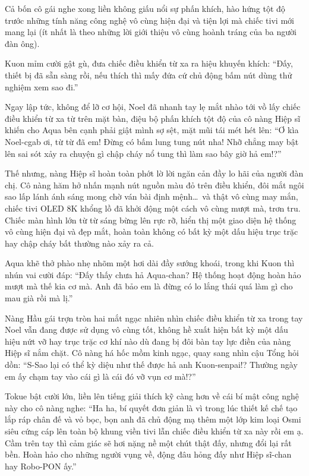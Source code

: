 \documentclass[../main.tex]{subfiles}
\begin{document}
Cả bốn cô gái nghe xong liền không giấu nổi sự phấn khích, hào hứng tột độ trước những tính năng công nghệ vô cùng hiện đại và tiện lợi mà chiếc tivi mới mang lại (ít nhất là theo những lời giới thiệu vô cùng hoành tráng của ba người đàn ông).

Kuon mỉm cười gật gù, đưa chiếc điều khiển từ xa ra hiệu khuyến khích: ``Đấy, thiết bị đã sẵn sàng rồi, nếu thích thì mấy đứa cứ chủ động bấm nút dùng thử nghiệm xem sao đi.''

Ngay lập tức, không để lỡ cơ hội, Noel đã nhanh tay lẹ mắt nhào tới vồ lấy chiếc điều khiển từ xa từ trên mặt bàn, điệu bộ phấn khích tột độ của cô nàng Hiệp sĩ khiến cho Aqua bên cạnh phải giật mình sợ sệt, mặt mũi tái mét hét lên: ``Ơ kìa Noel-cgab ơi, từ từ đã em! Đừng có bấm lung tung nút nha! Nhỡ chẳng may bật lên sai sót xảy ra chuyện gì chập cháy nổ tung thì làm sao bây giờ hả em!?''

Thế nhưng, nàng Hiệp sĩ hoàn toàn phớt lờ lời ngăn cản đầy lo hãi của người đàn chị. Cô nàng hăm hở nhấn mạnh nút nguồn màu đỏ trên điều khiển, đôi mắt ngôi sao lấp lánh ánh sáng mong chờ ván bài định mệnh\dots\ và thật vô cùng may mắn, chiếc tivi OLED 8K khổng lồ đã khởi động một cách vô cùng mượt mà, trơn tru. Chiếc màn hình lớn từ từ sáng bừng lên rực rỡ, hiển thị một giao diện hệ thống vô cùng hiện đại và đẹp mắt, hoàn toàn không có bất kỳ một dấu hiệu trục trặc hay chập cháy bất thường nào xảy ra cả.

Aqua khẽ thở phào nhẹ nhõm một hơi dài đầy sướng khoái, trong khi Kuon thì nhún vai cười đáp: ``Đấy thấy chưa hả Aqua-chan? Hệ thống hoạt động hoàn hảo mượt mà thế kia cơ mà. Anh đã bảo em là đừng có lo lắng thái quá làm gì cho mau già rồi mà lị.''

Nàng Hầu gái trợn tròn hai mắt ngạc nhiên nhìn chiếc điều khiển từ xa trong tay Noel vẫn đang được sử dụng vô cùng tốt, không hề xuất hiện bất kỳ một dấu hiệu nứt vỡ hay trục trặc cơ khí nào dù đang bị đôi bàn tay lực điền của nàng Hiệp sĩ nắm chặt. Cô nàng há hốc mồm kinh ngạc, quay sang nhìn cậu Tổng hỏi dồn: ``S-Sao lại có thể kỳ diệu như thế được hả anh Kuon-senpai!? Thường ngày em ấy chạm tay vào cái gì là cái đó vỡ vụn cơ mà!?''

Tokue bật cười lớn, liền lên tiếng giải thích kỹ càng hơn về cái bí mật công nghệ này cho cô nàng nghe: ``Ha ha, bí quyết đơn giản là vì trong lúc thiết kế chế tạo lắp ráp chân đế và vỏ bọc, bọn anh đã chủ động mạ thêm một lớp kim loại Osmi siêu cứng cáp lên toàn bộ khung viền tivi lẫn chiếc điều khiển từ xa này rồi em ạ. Cầm trên tay thì cảm giác sẽ hơi nặng nề một chút thật đấy, nhưng đổi lại rất bền. Hoàn hảo cho những người vụng về, động đâu hỏng đấy như Hiệp sĩ-chan hay Robo-PON ấy.''
\end{document}
